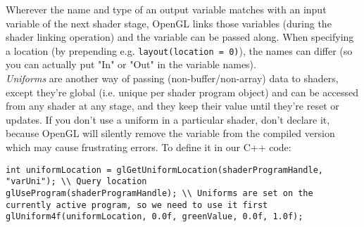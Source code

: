 \documentclass[8pt, table, xcdraw]{article}%
\begin{document}
Wherever the name and type of an output variable matches with an input variable of the next shader stage, OpenGL links those variables (during the shader linking operation) and the variable can be passed along. When specifying a location (by prepending e.g. \lstinline{layout(location = 0)}), the names can differ (so you can actually put "In" or "Out" in the variable names).\\
\emph{Uniforms} are another way of passing (non-buffer/non-array) data to shaders, except they're global (i.e. unique per shader program object) and can be accessed from any shader at any stage, and they keep their value until they're reset or updates. If you don't use a uniform in a particular shader, don't declare it, because OpenGL will silently remove the variable from the compiled version which may cause frustrating errors. To define it in our C++ code:

\begin{lstlisting}
int uniformLocation = glGetUniformLocation(shaderProgramHandle, "varUni"); \\ Query location
glUseProgram(shaderProgramHandle); \\ Uniforms are set on the currently active program, so we need to use it first
glUniform4f(uniformLocation, 0.0f, greenValue, 0.0f, 1.0f);
\end{lstlisting}
\end{document}
